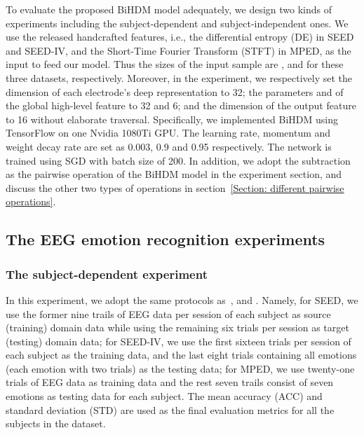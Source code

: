 \documentclass[journal]{IEEEtran}
\begin{document}
To evaluate the proposed BiHDM model adequately, we design two kinds of experiments including the subject-dependent and subject-independent ones. We use the released handcrafted features, i.e., the differential entropy (DE) in SEED and SEED-IV, and the Short-Time Fourier Transform (STFT) in MPED, as the input to feed our model. Thus the sizes  of the input sample  are ,  and  for these three datasets, respectively. Moreover, in the experiment, we respectively set the dimension  of each electrode's deep representation to 32; the parameters  and  of the global high-level feature to 32 and 6; and the dimension  of the output feature to 16 without elaborate traversal. Specifically, we implemented BiHDM using TensorFlow on one Nvidia 1080Ti GPU. The learning rate, momentum and weight decay rate are set as 0.003, 0.9 and 0.95 respectively. The network is trained using SGD with batch size of 200. In addition, we adopt the subtraction as the pairwise operation of the BiHDM model in the experiment section, and discuss the other two types of operations in section~\ref{Section: different pairwise operations}.


\subsection{The EEG emotion recognition experiments}
\subsubsection{The subject-dependent experiment}
In this experiment, we adopt the same protocols as~\cite{zheng2015investigating}, \cite{zheng2018emotionmeter} and \cite{8606087}. Namely, for SEED, we use the former nine trails of EEG data per session of each subject as source (training) domain data while using the remaining six trials per session as target (testing) domain data; for SEED-IV, we use the first sixteen trials per session of each subject as the training data, and the last eight trials containing all emotions (each emotion with two trials) as the testing data; for MPED, we use twenty-one trials of EEG data as training data and the rest seven trails consist of seven emotions as testing data for each subject. The mean accuracy (ACC) and standard deviation (STD) are used as the final evaluation metrics for all the subjects in the dataset. 
\end{document}
